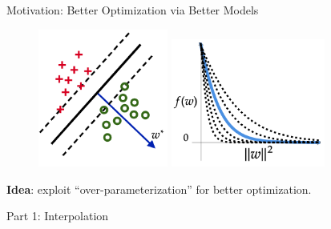 \documentclass[mathserif,notheorems, hyperref={colorlinks, citecolor=blue, urlcolor=blue, linkcolor=blue}]{beamer}
\begin{document}
    \begin{frame}{Motivation: Better Optimization via Better Models}

        \begin{figure}
            \centering
            \includegraphics[width=0.38\textwidth]{figures/separable}
            \hspace{0.2em}
            \includegraphics[width=0.45\textwidth]{figures/loss_fn}
        \end{figure}
        \vspace{0.2em}

        \begin{center}
            \large \textbf{Idea}: exploit ``over-parameterization'' for better optimization.\vspace{0.25em}
        \end{center}

    \end{frame}



    \begin{frame}
       \begin{center}
          \huge Part 1: Interpolation 
       \end{center} 
    \end{frame}

\end{document}
